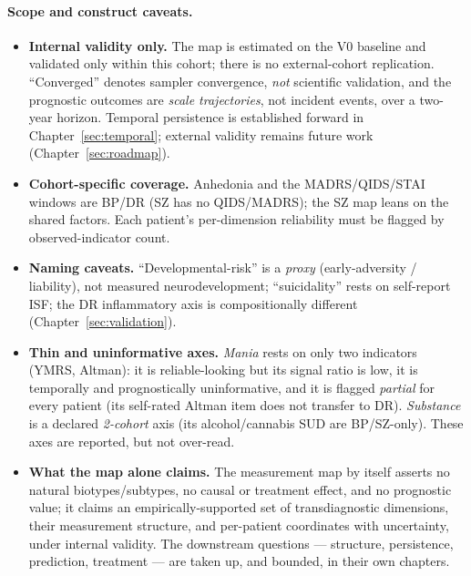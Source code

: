 \paragraph{Scope and construct caveats.}
\begin{itemize}\setlength{\itemsep}{1pt}
  \item \textbf{Internal validity only.} The map is estimated on the V0 baseline and validated only within
  this cohort; there is no external-cohort replication. ``Converged'' denotes sampler convergence, \emph{not}
  scientific validation, and the prognostic outcomes are \emph{scale trajectories}, not incident events,
  over a two-year horizon. Temporal persistence is established forward in Chapter~\ref{sec:temporal};
  external validity remains future work (Chapter~\ref{sec:roadmap}).
  \item \textbf{Cohort-specific coverage.} Anhedonia and the MADRS/QIDS/STAI windows are BP/DR (SZ has no
  QIDS/MADRS); the SZ map leans on the shared factors. Each patient's per-dimension reliability must be
  flagged by observed-indicator count.
  \item \textbf{Naming caveats.} ``Developmental-risk'' is a \emph{proxy} (early-adversity / liability), not
  measured neurodevelopment; ``suicidality'' rests on self-report ISF; the DR inflammatory axis is
  compositionally different (Chapter~\ref{sec:validation}).
  \item \textbf{Thin and uninformative axes.} \emph{Mania} rests on only two indicators (YMRS, Altman): it
  is reliable-looking but its signal ratio is low, it is temporally and prognostically uninformative, and
  it is flagged \emph{partial} for every patient (its self-rated Altman item does not transfer to DR).
  \emph{Substance} is a declared \emph{2-cohort} axis (its alcohol/cannabis SUD are BP/SZ-only). These axes
  are reported, but not over-read.
  \item \textbf{What the map alone claims.} The measurement map by itself asserts no natural
  biotypes/subtypes, no causal or treatment effect, and no prognostic value; it claims an
  empirically-supported set of transdiagnostic dimensions, their measurement structure, and per-patient
  coordinates with uncertainty, under internal validity. The downstream questions --- structure, persistence,
  prediction, treatment --- are taken up, and bounded, in their own chapters.
\end{itemize}

